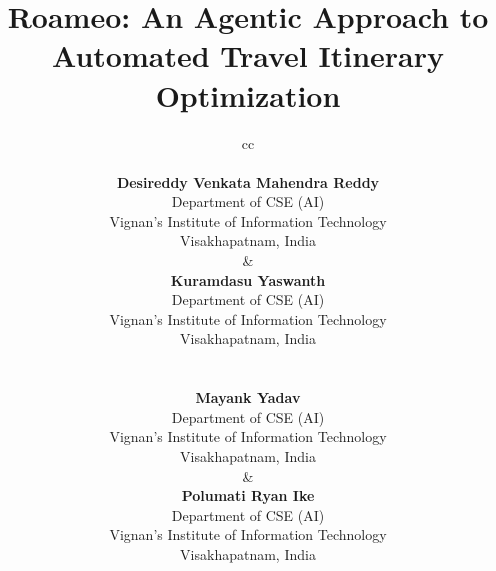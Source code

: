 \documentclass[conference]{IEEEtran}
\begin{document}
\title{Roameo: An Agentic Approach to Automated Travel Itinerary Optimization}

\author{
\begin{tabular}{cc}
 \\[3em]

\begin{minipage}{0.45\linewidth}
\centering
\textbf{Desireddy Venkata Mahendra Reddy}\\
Department of CSE (AI)\\
Vignan's Institute of Information Technology\\
Visakhapatnam, India
\end{minipage}
&
\begin{minipage}{0.45\linewidth}
\centering
\textbf{Kuramdasu Yaswanth}\\
Department of CSE (AI)\\
Vignan's Institute of Information Technology\\
Visakhapatnam, India
\end{minipage}
\\[3em]
\begin{minipage}{0.45\linewidth}
\centering
\textbf{Mayank Yadav}\\
Department of CSE (AI)\\
Vignan's Institute of Information Technology\\
Visakhapatnam, India
\end{minipage}
&
\begin{minipage}{0.45\linewidth}
\centering
\textbf{Polumati Ryan Ike}\\
Department of CSE (AI)\\
Vignan's Institute of Information Technology\\
Visakhapatnam, India
\end{minipage}
\end{tabular}
}

\maketitle
\end{document}
